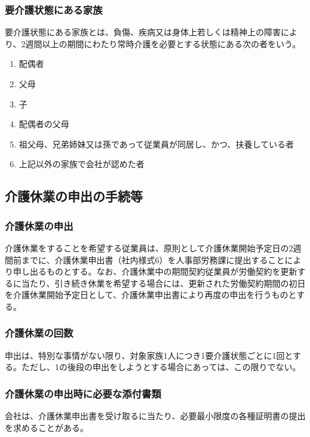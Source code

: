 \documentclass{jsarticle}
\begin{document}
\subsubsection{要介護状態にある家族}
\label{育介_項_要介護状態にある家族}
要介護状態にある家族とは、負傷、疾病又は身体上若しくは精神上の障害により、2週間以上の期間にわたり常時介護を必要とする状態にある次の者をいう。 
\begin{enumerate}
  \item 配偶者
  \item 父母
  \item 子 
  \item 配偶者の父母 
  \item 祖父母、兄弟姉妹又は孫であって従業員が同居し、かつ、扶養している者 
  \item 上記以外の家族で会社が認めた者
\end{enumerate}

\subsection{介護休業の申出の手続等}
\label{育介_条_介護休業の申出の手続等}

\subsubsection{介護休業の申出}
\label{育介_項_介護休業の申出}
介護休業をすることを希望する従業員は、原則として介護休業開始予定日の2週間前までに、介護休業申出書（社内様式6）を人事部労務課に提出することにより申し出るものとする。なお、介護休業中の期間契約従業員が労働契約を更新するに当たり、引き続き休業を希望する場合には、更新された労働契約期間の初日を介護休業開始予定日として、介護休業申出書により再度の申出を行うものとする。

\subsubsection{介護休業の回数}
\label{育介_項_介護休業の回数}
申出は、特別な事情がない限り、対象家族1人につき1要介護状態ごとに1回とする。ただし、1の後段の申出をしようとする場合にあっては、この限りでない。

\subsubsection{介護休業の申出時に必要な添付書類}
\label{育介_項_介護休業の申出時に必要な添付書類}
会社は、介護休業申出書を受け取るに当たり、必要最小限度の各種証明書の提出を求めることがある。
\end{document}

